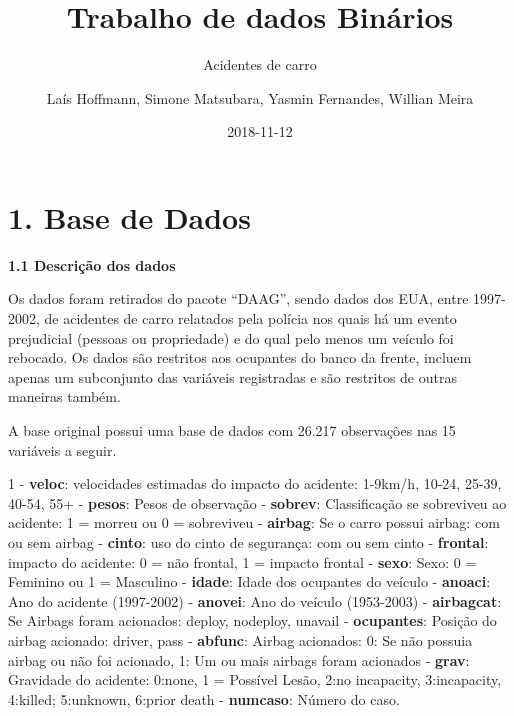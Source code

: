 \documentclass[]{article}
\title{Trabalho de dados Binários}
\subtitle{Acidentes de carro}
\author{Laís Hoffmann, Simone Matsubara, Yasmin Fernandes, Willian Meira}
\date{2018-11-12}
\begin{document}
\maketitle

\section{1. Base de Dados}\label{base-de-dados}

\textbf{1.1 Descrição dos dados}

Os dados foram retirados do pacote ``DAAG'', sendo dados dos EUA, entre
1997-2002, de acidentes de carro relatados pela polícia nos quais há um
evento prejudicial (pessoas ou propriedade) e do qual pelo menos um
veículo foi rebocado. Os dados são restritos aos ocupantes do banco da
frente, incluem apenas um subconjunto das variáveis registradas e são
restritos de outras maneiras também.

A base original possui uma base de dados com 26.217 observações nas 15
variáveis a seguir.

1 - \textbf{veloc}: velocidades estimadas do impacto do acidente:
1-9km/h, 10-24, 25-39, 40-54, 55+  - \textbf{pesos}: Pesos de
observação  - \textbf{sobrev}: Classificação se sobreviveu ao
acidente: 1 = morreu ou 0 = sobreviveu  - \textbf{airbag}: Se
o carro possui airbag: com ou sem airbag  - \textbf{cinto}:
uso do cinto de segurança: com ou sem cinto  -
\textbf{frontal}: impacto do acidente: 0 = não frontal, 1 = impacto
frontal  - \textbf{sexo}: Sexo: 0 = Feminino ou 1 = Masculino
 - \textbf{idade}: Idade dos ocupantes do veículo  -
\textbf{anoaci}: Ano do acidente (1997-2002)  -
\textbf{anovei}: Ano do veículo (1953-2003)  -
\textbf{airbagcat}: Se Airbags foram acionados: deploy, nodeploy,
unavail  - \textbf{ocupantes}: Posição do airbag acionado:
driver, pass  - \textbf{abfunc}: Airbag acionados: 0: Se não
possuia airbag ou não foi acionado, 1: Um ou mais airbags foram
acionados  - \textbf{grav}: Gravidade do acidente: 0:none, 1
= Possível Lesão, 2:no incapacity, 3:incapacity, 4:killed; 5:unknown,
6:prior death  - \textbf{numcaso}: Número do caso.
\end{document}
